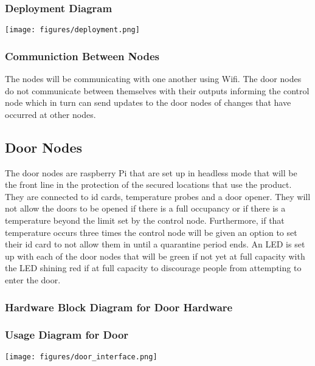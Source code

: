 \subsubsection{Deployment Diagram}

\texttt{[image: figures/deployment.png]}

\subsubsection{Communiction Between Nodes}
The nodes will be communicating with one another using Wifi. The door nodes do not communicate between themselves with their outputs informing the control node which in turn can send updates to the door nodes of changes that have occurred at other nodes.

\subsection{Door Nodes}
The door nodes are raspberry Pi that are set up in headless mode that will be the front line in the protection of the secured locations that use the product. They are connected to id cards, temperature probes and a door opener. They will not allow the doors to be opened if there is a full occupancy or if there is a temperature beyond the limit set by the control node. Furthermore, if that temperature occurs three times the control node will be given an option to set their id card to not allow them in until a quarantine period ends. An LED is set up with each of the door nodes that will be green if not yet at full capacity with the LED shining red if at full capacity to discourage people from attempting to enter the door.

\subsubsection{Hardware Block Diagram for Door Hardware}

\subsubsection{Usage Diagram for Door}

\texttt{[image: figures/door\_interface.png]}

